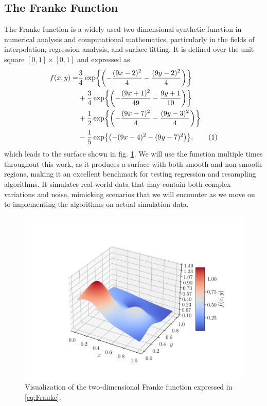 \documentclass[aps,pra,english,notitlepage,reprint,nofootinbib]{revtex4-1}  %
\newcommand\numberthis{\addtocounter{equation}{1}\tag{\theequation}}
\begin{document}
\subsection{The Franke Function}\label{subsec:franke}
The Franke function is a widely used two-dimensional synthetic function in numerical analysis and computational mathematics, particularly in the fields of interpolation, regression analysis, and surface fitting. It is defined over the unit square $[0, 1] \times [0, 1]$ and expressed as
\begin{align*}
  f(x,y) =& \frac{3}{4} \exp{\left( -\frac{(9x - 2)^2}{4} - \frac{(9y - 2)^2}{4} \right)} \\
&+ \frac{3}{4} \exp{\left( -\frac{(9x + 1)^2}{49} - \frac{9y + 1}{10} \right)} \\
&+ \frac{1}{2} \exp{\left( -\frac{(9x - 7)^2}{4} - \frac{(9y - 3)^2}{4} \right)} \\
&- \frac{1}{5} \exp{\left( -(9x - 4)^2 - (9y - 7)^2 \right)}, \numberthis\label{eq:Franke}
\end{align*}
which leads to the surface shown in fig. \ref{fig:Franke}. We will use the function multiple times throughout this work, as it produces a surface with both smooth and non-smooth regions, making it an excellent benchmark for testing regression and resampling algorithms. It simulates real-world data that may contain both complex variations and noise, mimicking scenarios that we will encounter as we move on to implementing the algorithms on actual simulation data.

\begin{figure}[h!]
  \vspace*{-5pt}
  \centering %
  \includegraphics[trim=2.8cm 0.5cm 1.0cm 0.5cm,clip,width=\columnwidth,keepaspectratio]{../figs/a_Franke_surf.pdf}
  \caption{Visualization of the two-dimensional Franke function expressed in \eqref{eq:Franke}.}\label{fig:Franke}
  \vspace*{-5pt}
\end{figure}
\end{document}
